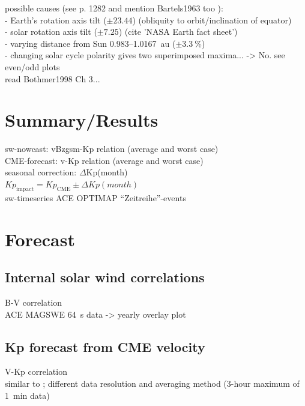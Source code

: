 possible causes (see \citet{Rangarajan1997} p. 1282 and mention Bartels1963 too
):\\
- Earth's rotation axis tilt ($\pm23.44$\textdegree) (obliquity to orbit/inclination of equator)\\
- solar rotation axis tilt ($\pm7.25$\textdegree) (cite 'NASA Earth fact sheet')\\
- varying distance from Sun 0.983--1.0167~au ($\pm3.3~\%$)\\
- changing solar cycle polarity gives two superimposed maxima... -> No. see even/odd plots\\

read Bothmer1998 Ch 3...\\


\section{Summary/Results}

sw-nowcast: vBzgsm-Kp relation (average and worst case)\\
CME-forecast: v-Kp relation (average and worst case)\\

seasonal correction: $\Delta$Kp(month)\\
$Kp_\text{impact} = Kp_\text{CME} \pm \Delta Kp(month)$\\

sw-timeseries ACE OPTIMAP ``Zeitreihe''-events

\section{Forecast}

\subsection{Internal solar wind correlations}

B-V correlation\\
ACE MAGSWE 64~s data -> yearly overlay plot\\


\subsection{Kp forecast from CME velocity}

V-Kp correlation\\
similar to \citet{Elliott2013}; different data resolution and averaging method (3-hour maximum of 1~min data)

